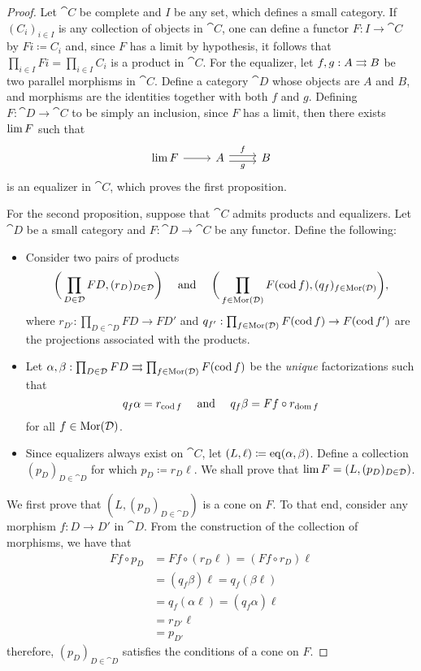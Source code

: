 \begin{proof}
Let \(\cat C\) be complete and \(I\) be any set, which defines a small
category. If \((C_i)_{i \in I}\) is any collection of objects in \(\cat C\), one
can define a functor \(F: I \to \cat C\) by \(F i \coloneq C_i\) and, since
\(F\) has a limit by hypothesis, it follows that
\(\prod_{i \in I} F i = \prod_{i \in I} C_i\) is a product in \(\cat C\). For
the equalizer, let \(f, g: A \rightrightarrows B\) be two parallel morphisms in \(\cat
C\). Define a category \(\cat D\) whose objects are \(A\) and \(B\), and
morphisms are the identities together with both \(f\) and \(g\). Defining \(F:
\cat D \to \cat C\) to be simply an inclusion, since \(F\) has a limit, then
there exists \(\operatorname{lim} F\) such that
\[
\begin{tikzcd}
\Lim F \ar[r] &A \ar[r, shift left, "f"] \ar[r, shift right, "g"']
&B
\end{tikzcd}
\]
is an equalizer in \(\cat C\), which proves the first proposition.

For the second proposition, suppose that \(\cat C\) admits products and
equalizers. Let \(\cat D\) be a small category and \(F: \cat D \to \cat C\) be
any functor. Define the following:

\begin{itemize}\setlength\itemsep{0em}
\item Consider two pairs of products
  \[
  \bigg(\prod_{D \in \mathcal D} F D, (r_D)_{D \in \mathcal D}\bigg)
  \quad\text{ and }\quad
  \bigg(\prod_{f \in \operatorname{Mor}(\mathcal D)} F(\operatorname{cod} f),
    (q_f)_{f \in \operatorname{Mor}(\mathcal D)}\bigg),
  \]
  where \(r_{D'}: \prod_{D \in \cat D} F D \to F D'\) and
  \(q_{f'}: \prod_{f \in \operatorname{Mor}(\mathcal D)} F (\operatorname{cod} f) \to F (\operatorname{cod} f')\) are the
  projections associated with the products.

\item Let
  \(\alpha, \beta: \prod_{D \in \mathcal D} F D \rightrightarrows \prod_{f \in \operatorname{Mor}(\mathcal D)} F
  (\operatorname{cod} f)\) be the \emph{unique} factorizations such that
  \[
  q_f \alpha = r_{\operatorname{cod} f}
  \quad\text{ and }\quad
  q_f \beta = F f \circ r_{\operatorname{dom} f}
  \]
  for all \(f \in \operatorname{Mor}(\mathcal D)\).
\item Since equalizers always exist on \(\cat C\), let
  \((L, \ell) \coloneq \operatorname{eq}(\alpha, \beta)\). Define a collection
  \((p_D)_{D \in \cat D}\) for which \(p_D \coloneq r_D \ell\). We shall prove
  that \(\operatorname{lim} F = (L, (p_D)_{D \in \mathcal D})\).
\end{itemize}

We first prove that \((L, (p_D)_{D \in \cat D})\) is a cone on \(F\). To that
end, consider any morphism \(f: D \to D'\) in \(\cat D\). From the construction
of the collection of morphisms, we have that
\begin{align*}
F f \circ p_D
&= F f \circ (r_D \ell)
= (F f \circ r_D) \ell \\
&= (q_f \beta) \ell
= q_f (\beta \ell) \\
&= q_f (\alpha \ell)
= (q_f \alpha) \ell \\
&= r_{D'} \ell \\
&= p_{D'}
\end{align*}
therefore, \((p_D)_{D \in \cat D}\) satisfies the conditions of a cone on \(F\).


\end{proof}
